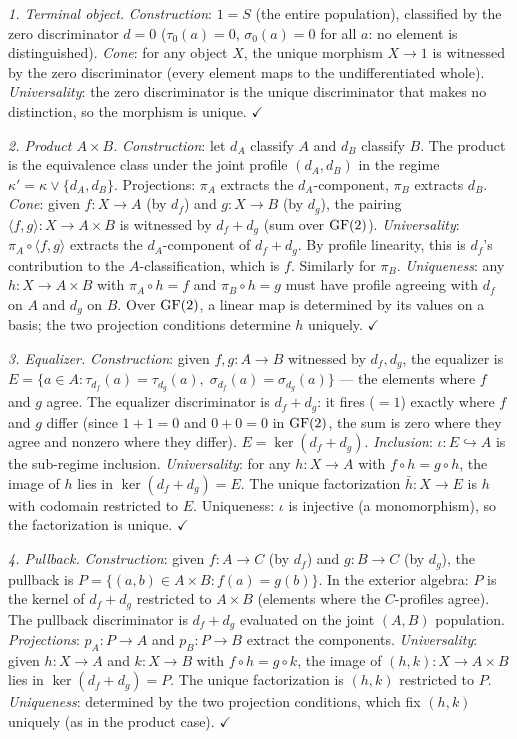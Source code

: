 \emph{1. Terminal object.}
\emph{Construction}: $1 = S$ (the entire population),
classified by the zero discriminator $d = 0$
($\tau_0(a) = 0$, $\sigma_0(a) = 0$ for all $a$: no
element is distinguished). \emph{Cone}: for any object
$X$, the unique morphism $X \to 1$ is witnessed by the
zero discriminator (every element maps to the
undifferentiated whole). \emph{Universality}: the zero
discriminator is the unique discriminator that makes no
distinction, so the morphism is unique. $\checkmark$

\emph{2. Product $A \times B$.}
\emph{Construction}: let $d_A$ classify $A$ and $d_B$
classify $B$. The product is the equivalence class under
the joint profile $(d_A, d_B)$ in the regime
$\kappa' = \kappa \vee \{d_A, d_B\}$. Projections:
$\pi_A$ extracts the $d_A$-component, $\pi_B$ extracts
$d_B$.
\emph{Cone}: given $f: X \to A$ (by $d_f$) and
$g: X \to B$ (by $d_g$), the pairing
$\langle f, g \rangle: X \to A \times B$ is
witnessed by $d_f + d_g$ (sum over $\operatorname{GF}(2)$).
\emph{Universality}: $\pi_A \circ \langle f, g \rangle$
extracts the $d_A$-component of $d_f + d_g$. By profile
linearity, this is $d_f$'s contribution to the
$A$-classification, which is $f$. Similarly for $\pi_B$.
\emph{Uniqueness}: any $h: X \to A \times B$ with
$\pi_A \circ h = f$ and $\pi_B \circ h = g$ must have
profile agreeing with $d_f$ on $A$ and $d_g$ on $B$.
Over $\operatorname{GF}(2)$, a linear map is determined by its values
on a basis; the two projection conditions determine $h$
uniquely. $\checkmark$

\emph{3. Equalizer.}
\emph{Construction}: given $f, g: A \to B$ witnessed by
$d_f, d_g$, the equalizer is $E = \{a \in A :
\tau_{d_f}(a) = \tau_{d_g}(a),\; \sigma_{d_f}(a) =
\sigma_{d_g}(a)\}$ --- the elements where $f$ and $g$
agree. The equalizer discriminator is $d_f + d_g$: it
fires ($= 1$) exactly where $f$ and $g$ differ (since
$1 + 1 = 0$ and $0 + 0 = 0$ in $\operatorname{GF}(2)$, the sum is
zero where they agree and nonzero where they differ).
$E = \ker(d_f + d_g)$.
\emph{Inclusion}: $\iota: E \hookrightarrow A$ is the
sub-regime inclusion.
\emph{Universality}: for any $h: X \to A$ with
$f \circ h = g \circ h$, the image of $h$ lies in
$\ker(d_f + d_g) = E$. The unique factorization
$\bar{h}: X \to E$ is $h$ with codomain restricted to
$E$. Uniqueness: $\iota$ is injective (a monomorphism),
so the factorization is unique. $\checkmark$

\emph{4. Pullback.}
\emph{Construction}: given $f: A \to C$ (by $d_f$) and
$g: B \to C$ (by $d_g$), the pullback is
$P = \{(a, b) \in A \times B : f(a) = g(b)\}$.
In the exterior algebra: $P$ is the kernel of
$d_f + d_g$ restricted to $A \times B$ (elements where
the $C$-profiles agree). The pullback discriminator is
$d_f + d_g$ evaluated on the joint $(A, B)$ population.
\emph{Projections}: $p_A: P \to A$ and $p_B: P \to B$
extract the components.
\emph{Universality}: given $h: X \to A$ and $k: X \to B$
with $f \circ h = g \circ k$, the image of
$(h, k): X \to A \times B$ lies in $\ker(d_f + d_g) = P$.
The unique factorization is $(h, k)$ restricted to $P$.
\emph{Uniqueness}: determined by the two projection
conditions, which fix $(h, k)$ uniquely (as in the
product case). $\checkmark$

